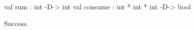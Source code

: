 \chklistingtrue
{}
\begin{ChkListingMsg}
val sum : int -D-> int
val consume : int * int * int -D-> bool
\end{ChkListingMsg}
\begin{ChkListingErr}
Success.
\end{ChkListingErr}
